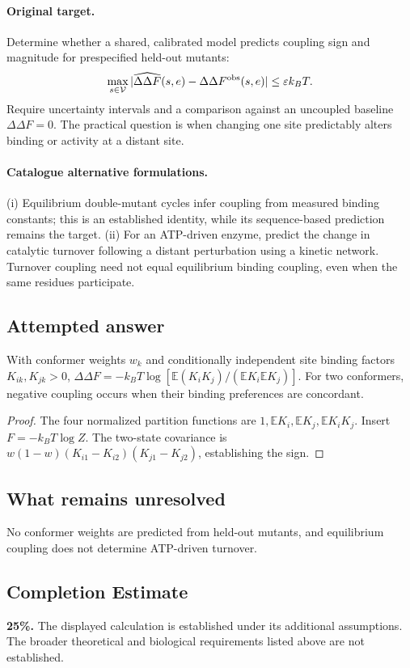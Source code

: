 \documentclass[11pt]{article}
\begin{document}
\paragraph{Original target.}
Determine whether a shared, calibrated model predicts coupling sign and magnitude for prespecified held-out mutants:
\[
\max_{s\in\mathcal V}|\widehat{\Delta\Delta F}(s,e)-\Delta\Delta F^{\rm obs}(s,e)|\leq\varepsilon k_BT.
\]
Require uncertainty intervals and a comparison against an uncoupled baseline $\Delta\Delta F=0$. The practical question is when changing one site predictably alters binding or activity at a distant site.
\paragraph{Catalogue alternative formulations.}
(i) Equilibrium double-mutant cycles infer coupling from measured binding constants; this is an established identity, while its sequence-based prediction remains the target. (ii) For an ATP-driven enzyme, predict the change in catalytic turnover following a distant perturbation using a kinetic network. Turnover coupling need not equal equilibrium binding coupling, even when the same residues participate.
\subsection{Attempted answer}
\begin{proposition}
With conformer weights $w_k$ and conditionally independent site binding factors $K_{ik},K_{jk}>0$, $\Delta\Delta F=-k_BT\log[\mathbb{E}(K_iK_j)/(\mathbb{E} K_i\mathbb{E} K_j)]$. For two conformers, negative coupling occurs when their binding preferences are concordant.
\end{proposition}
\begin{proof}
The four normalized partition functions are $1,\mathbb{E} K_i,\mathbb{E} K_j,\mathbb{E} K_iK_j$. Insert $F=-k_BT\log Z$. The two-state covariance is $w(1-w)(K_{i1}-K_{i2})(K_{j1}-K_{j2})$, establishing the sign.
\end{proof}
\subsection{What remains unresolved}
No conformer weights are predicted from held-out mutants, and equilibrium coupling does not determine ATP-driven turnover.
\subsection{Completion Estimate}
\textbf{25\%.} The displayed calculation is established under its additional assumptions. The broader theoretical and biological requirements listed above are not established.
\end{document}
